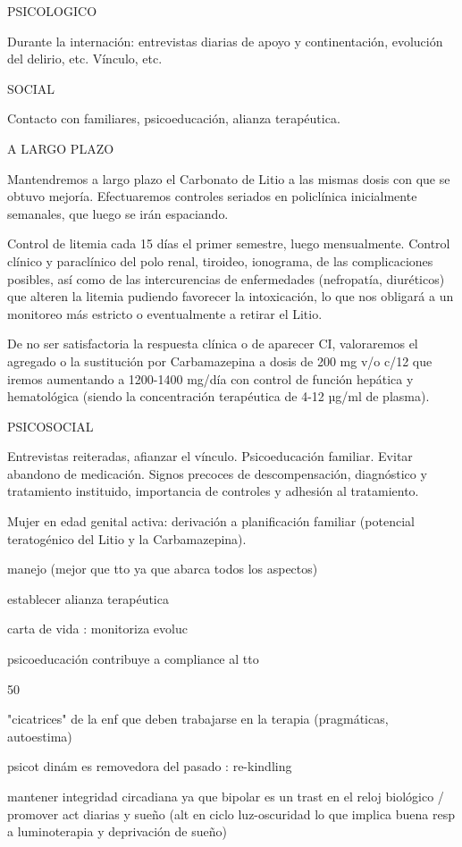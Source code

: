 PSICOLOGICO

Durante la internación: entrevistas diarias de apoyo y continentación, evolución del delirio, etc. Vínculo, etc.

SOCIAL

Contacto con familiares, psicoeducación, alianza terapéutica.

A LARGO PLAZO

Mantendremos a largo plazo el Carbonato de Litio a las mismas dosis con que se obtuvo mejoría. Efectuaremos controles seriados en policlínica inicialmente semanales, que luego se irán espaciando.

Control de litemia cada 15 días el primer semestre, luego mensualmente. Control clínico y paraclínico del polo renal, tiroideo, ionograma, de las complicaciones posibles, así como de las intercurencias de enfermedades (nefropatía, diuréticos) que alteren la litemia pudiendo favorecer la intoxicación, lo que nos obligará a un monitoreo más estricto o eventualmente a retirar el Litio.

De no ser satisfactoria la respuesta clínica o de aparecer CI, valoraremos el agregado o la sustitución por Carbamazepina a dosis de 200 mg v/o c/12 que iremos aumentando a 1200-1400 mg/día con control de función hepática y hematológica (siendo la concentración terapéutica de 4-12 µg/ml de plasma).

PSICOSOCIAL

Entrevistas reiteradas, afianzar el vínculo. Psicoeducación familiar. Evitar abandono de medicación. Signos precoces de descompensación, diagnóstico y tratamiento instituido, importancia de controles y adhesión al tratamiento.

Mujer en edad genital activa: derivación a planificación familiar (potencial teratogénico del Litio y la Carbamazepina).

manejo (mejor que tto ya que abarca todos los aspectos)

establecer alianza terapéutica

carta de vida : monitoriza evoluc

psicoeducación contribuye a compliance al tto

50 %

"cicatrices" de la enf que deben trabajarse en la terapia (pragmáticas, autoestima)

psicot dinám es removedora del pasado : re-kindling

mantener integridad circadiana ya que bipolar es un trast en el reloj biológico / promover act diarias y sueño (alt en ciclo luz-oscuridad lo que implica buena resp a luminoterapia y deprivación de sueño)

